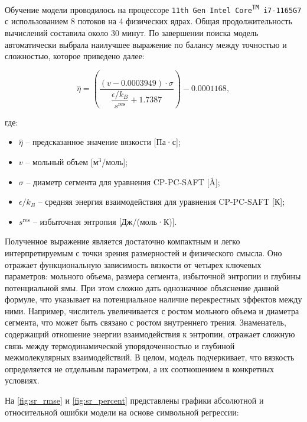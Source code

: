 \documentclass[a4paper,12pt]{article}
\begin{document}
Обучение модели проводилось на процессоре \texttt{11th Gen Intel\textsuperscript{\textregistered} Core\textsuperscript{TM} i7-1165G7} с использованием 8 потоков на 4 физических ядрах. Общая продолжительность вычислений составила около 30 минут. По завершении поиска модель автоматически выбрала наилучшее выражение по балансу между точностью и сложностью, которое приведено далее:
    
    \begin{equation}
    \hat{\eta} = \left( \frac{(v - 0.0003949) \cdot \sigma}{\dfrac{\epsilon / k_B}{s^{\text{res}}} + 1.7387} \right) - 0.0001168,
    \end{equation}
    
    где:
    \begin{itemize}
      \item \( \hat{\eta} \) -- предсказанное значение вязкости [Па·с];
      \item \( v \) -- мольный объем [м\(^3\)/моль];
      \item \( \sigma \) -- диаметр сегмента для уравнения CP-PC-SAFT [\si{\angstrom}];
      \item \( \epsilon/k_B \) -- средняя энергия взаимодействия для уравнения CP-PC-SAFT [К];
      \item \( s^{\text{res}} \) -- избыточная энтропия [Дж/(моль·К)].
    \end{itemize}

    Полученное выражение является достаточно компактным и легко интерпретируемым с точки зрения размерностей и физического смысла. Оно отражает функциональную зависимость вязкости от четырех ключевых параметров: мольного объема, размера сегмента, избыточной энтропии и глубины потенциальной ямы. При этом сложно дать однозначное объяснение данной формуле, что указывает на потенциальное наличие перекрестных эффектов между ними. Например, числитель увеличивается с ростом мольного объема и диаметра сегмента, что может быть связано с ростом внутреннего трения. Знаменатель, содержащий отношение энергии взаимодействия к энтропии, отражает сложную связь между термодинамической упорядоченностью и глубиной межмолекулярных взаимодействий. В целом, модель подчеркивает, что вязкость определяется не отдельным параметром, а их соотношением в конкретных условиях.

    \medskip
    
    На \autoref{fig:sr_rmse} и \autoref{fig:sr_percent} представлены графики абсолютной и относительной ошибки модели на основе символьной регрессии:
    
\end{document}
